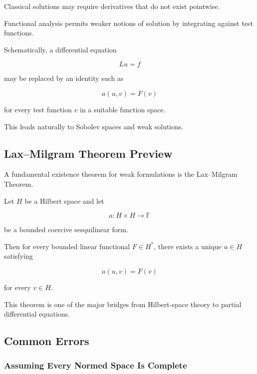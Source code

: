 Classical solutions may require derivatives that do not exist pointwise.

Functional analysis permits weaker notions of solution by integrating
against test functions.

Schematically, a differential equation

\[
Lu=f
\]

may be replaced by an identity such as

\[
\boxed{
a(u,v)=F(v)
}
\]

for every test function \(v\) in a suitable function space.

This leads naturally to Sobolev spaces and weak solutions.

\subsection{Lax--Milgram Theorem Preview}
\label{subsec:lax-milgram-preview}

A fundamental existence theorem for weak formulations is the
Lax--Milgram Theorem.

\begin{theorem}
Let \(H\) be a Hilbert space and let

\[
a:H\times H\to\mathbb{F}
\]

be a bounded coercive sesquilinear form.

Then for every bounded linear functional \(F\in H^*\), there exists a
unique \(u\in H\) satisfying

\[
\boxed{
a(u,v)=F(v)
}
\]

for every \(v\in H\).
\end{theorem}

This theorem is one of the major bridges from Hilbert-space theory to
partial differential equations.

\subsection{Common Errors}
\label{subsec:functional-analysis-common-errors}

\subsubsection{Assuming Every Normed Space Is Complete}

